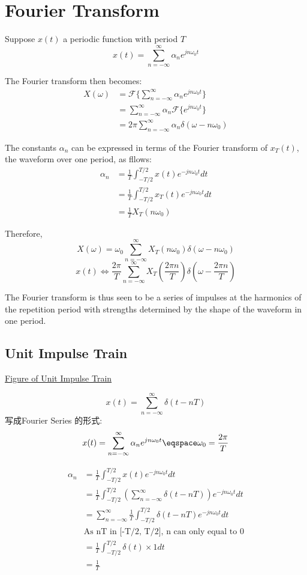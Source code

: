 \documentclass{article}
\begin{document}
\section{Fourier Transform}
Suppose $x(t)$ a periodic function with period $T$
$$ x(t) = \sum_{n = - \infty}^{\infty} \alpha_n e^{jn\omega_0 t} $$

The Fourier transform then becomes:
$$
\begin{aligned}
		X(\omega) & = \mathcal{F}\{\sum_{n = - \infty}^{\infty} \alpha_n e^{jn\omega_0 t}\} \\
				  & =  \sum_{n = - \infty}^{\infty} \alpha_n \mathcal{F}\{e^{jn\omega_0 t}\} \\
				  & =  2\pi \sum_{n = - \infty}^{\infty} \alpha_n \delta(\omega - n \omega_0)
\end{aligned}
$$

The constants $\alpha_n$ can be expressed in terms of the Fourier transform of $x_T(t)$, the waveform over one period, as fllows:
$$
\begin{aligned}
		\alpha_n & = \frac{1}{T} \int_{ - T/2}^{T/2} x(t) e^{-jn\omega_0 t}dt \\
			     & = \frac{1}{T} \int_{ - T/2}^{T/2} x_T(t) e^{-jn\omega_0 t}dt \\
  				   & = \frac{1}{T} X_T(n\omega_0)
\end{aligned}
$$

Therefore, 
$$ X(\omega) = \omega_0 \sum_{n = - \infty}^{\infty} X_T(n\omega_0)\delta(\omega - n \omega_0) $$
$$ x(t) \Leftrightarrow \frac{2\pi}{T} \sum_{n = - \infty}^{\infty} X_T(\frac{2\pi n}{T})\delta(\omega - \frac{2\pi n}{T}) $$

The Fourier transform is thus seen to be a series of impulses at the harmonics of the repetition period with strengths determined by the shape of the waveform in one period.

\subsection{Unit Impulse Train}
\href{http://upload.wikimedia.org/wikipedia/commons/thumb/4/49/Dirac\_comb.svg/300px-Dirac\_comb.svg.png}{Figure of Unit Impulse Train}

$$x(t) = \sum_{n = - \infty}^{\infty} \delta(t - nT)$$
写成Fourier Series 的形式:
$$x(t) = \sum_{n = - \infty}^{\infty} \alpha_n e^{jn\omega_0 t} \eqspace \omega_0 = \frac{2\pi}{T}$$

$$
\begin{aligned}
		\alpha_n & = \frac{1}{T} \int_{ - T/2}^{T/2} x(t) e^{-jn\omega_0 t}dt \\
				& = \frac{1}{T} \int_{ - T/2}^{T/2} (\sum_{n = - \infty}^{\infty} \delta(t - nT)) e^{-jn\omega_0 t}dt \\
				& = \sum_{n=-\infty}^{\infty} \frac{1}{T} \int_{ - T/2}^{T/2} \delta(t - nT) e^{-jn\omega_0 t}dt \\
			 	&\text{As nT in [-T/2, T/2], n can only equal to 0}\\
				 &= \frac{1}{T} \int_{-T/2}^{T/2} \delta(t) \times 1 dt \\
				 & = \frac{1}{T}
\end{aligned}
$$
\end{document}
